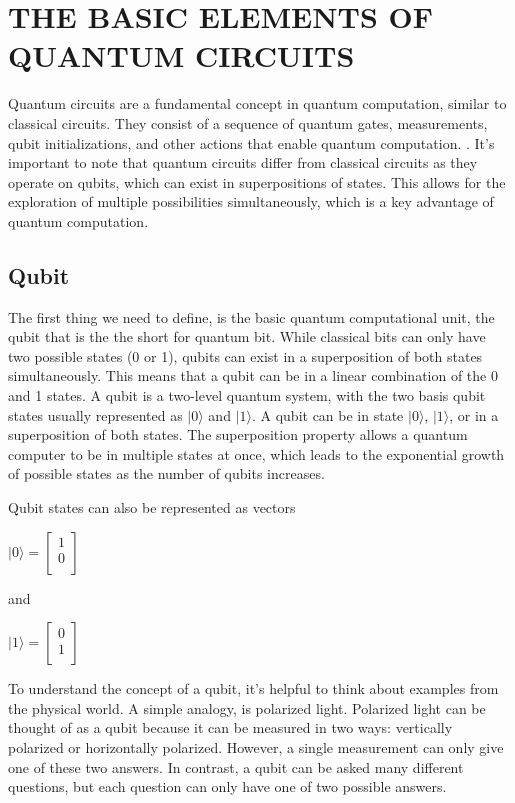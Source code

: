 \documentclass[inscr,ack,preface]{diphdthesis}
\begin{document}
\chapter{THE BASIC ELEMENTS OF QUANTUM CIRCUITS}

Quantum circuits are a fundamental concept in quantum computation, similar to classical circuits. They consist of a sequence of quantum gates, measurements, qubit initializations, and other actions that enable quantum computation. \cite{niel}. It's important to note that quantum circuits differ from classical circuits as they operate on qubits, which can exist in superpositions of states. This allows for the exploration of multiple possibilities simultaneously, which is a key advantage of quantum computation. 

\section{Qubit}

The first thing we need to define, is the basic quantum computational unit, the qubit that is the the short for quantum bit. 
 While classical bits can only have two possible states (0 or 1), qubits can exist in a superposition of both states simultaneously. This means that a qubit can be in a linear combination of the 0 and 1 states. A qubit is a two-level quantum system, with the two basis qubit states usually represented as $\vert0\rangle$ and $\vert1\rangle$. A qubit can be in state $\vert0\rangle$, $\vert1\rangle$, or in a superposition of both states. The superposition property allows a quantum computer to be in multiple states at once, which leads to the exponential growth of possible states as the number of qubits increases.\cite{qubit}
 
 Qubit states can also be represented as vectors
 \begin{center}
 \Large
 $\vert0\rangle = 
    \begin{bmatrix}
    1 \\
    0 \\
    \end{bmatrix}$
\end{center}
\normalsize
and \\
\begin{center}
\Large
$\vert1\rangle = 
\begin{bmatrix}
0 \\
1 \\
\end{bmatrix}$
\end{center}
\normalsize
To understand the concept of a qubit, it's helpful to think about examples from the physical world. A simple analogy, is polarized light. Polarized light can be thought of as a qubit because it can be measured in two ways: vertically polarized or horizontally polarized. However, a single measurement can only give one of these two answers. In contrast, a qubit can be asked many different questions, but each question can only have one of two possible answers\cite{polarized}.
\end{document}
